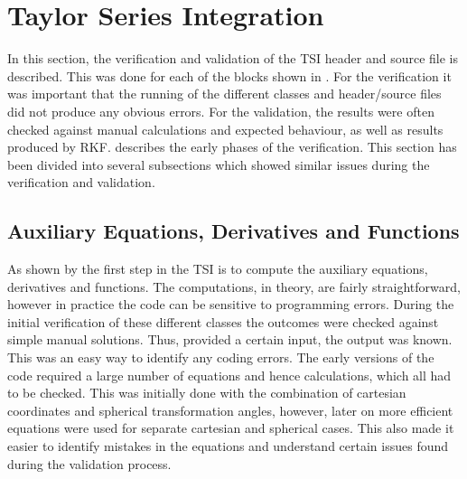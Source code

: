 \section{Taylor Series Integration}
\label{sec:tsiverval}
In this section, the verification and validation of the \ac{TSI} header and source file is described. This was done for each of the blocks shown in . For the verification it was important that the running of the different classes and header/source files did not produce any obvious errors. For the validation, the results were often checked against manual calculations and expected behaviour, as well as results produced by \ac{RKF}.   describes the early phases of the verification. This section has been divided into several subsections which showed similar issues during the verification and validation.

\subsection{Auxiliary Equations, Derivatives and Functions}
\label{subsec:auxEqDerFunverval}
As shown by  the first step in the \ac{TSI} is to compute the auxiliary equations, derivatives and functions. The computations, in theory, are fairly straightforward, however in practice the code can be sensitive to programming errors. During the initial verification of these different classes the outcomes were checked against simple manual solutions. Thus, provided a certain input, the output was known. This was an easy way to identify any coding errors. The early versions of the code required a large number of equations and hence calculations, which all had to be checked. This was initially done with the combination of cartesian coordinates and spherical transformation angles, however, later on more efficient equations were used for separate cartesian and spherical cases. This also made it easier to identify mistakes in the equations and understand certain issues found during the validation process. 

